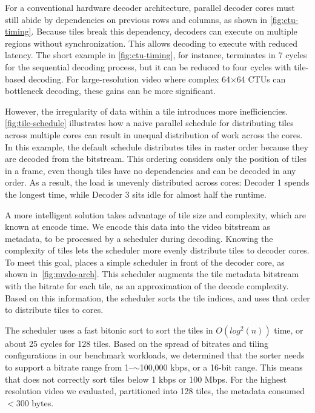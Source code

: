 \vdecCTUTimingFigure

For a conventional hardware decoder architecture, parallel decoder cores must still abide by dependencies on previous rows and columns, as shown in \ref{fig:ctu-timing}.
Because tiles break this dependency, decoders can execute on multiple regions without synchronization.
This allows decoding to execute with reduced latency.
The short example in \ref{fig:ctu-timing}, for instance, terminates in 7 cycles for the sequential decoding process, but it can be reduced to four cycles with tile-based decoding.
For large-resolution video where complex 64$\times$64 CTUs can bottleneck decoding, these gains can be more significant.

However, the irregularity of data within a tile introduces more inefficiencies.
\ref{fig:tile-schedule} illustrates how a naive parallel schedule for distributing tiles across multiple cores can result in unequal distribution of work across the cores.
In this example, the default schedule distributes tiles in raster order because they are decoded from the \hevc bitstream.
This ordering considers only the position of tiles in a frame, even though tiles have no dependencies and can be decoded in any order.
As a result, the load is unevenly distributed across cores: Decoder 1 spends the longest time, while Decoder 3 sits idle for almost half the runtime.

A more intelligent solution takes advantage of tile size and complexity, which are known at encode time.
We encode this data into the video bitstream as metadata, to be processed by a scheduler during decoding.
Knowing the complexity of tiles lets the scheduler more evenly distribute tiles to decoder cores.
To meet this goal, \nameArch places a simple scheduler in front of the decoder core, as shown in~\ref{fig:mvdo-arch}.
This scheduler augments the tile metadata bitstream with the bitrate for each tile, as an approximation of the decode complexity.
Based on this information, the scheduler sorts the tile indices, and uses that order to distribute tiles to cores.

\coresVsDecodeSpeedupFigure


The scheduler uses a fast bitonic sort to sort the tiles in $O(log^2(n))$ time, or about 25 cycles for 128 tiles.
Based on the spread of bitrates and tiling configurations in our benchmark workloads, we determined that the sorter needs to support a bitrate range from 1--$\sim$100,000 kbps, or a 16-bit range.
This means that \nameArch does not correctly sort tiles below 1 kbps or 100 Mbps.
For the highest resolution video we evaluated, partitioned into 128 tiles, the metadata consumed $<300$ bytes.

